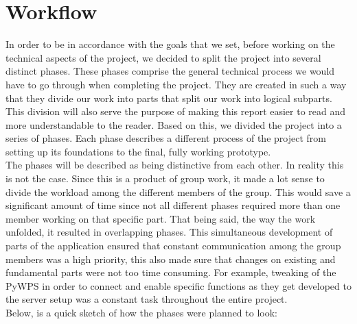 \section{Workflow}
In order to be in accordance with the goals that we set, before working on the technical aspects of the project, we decided to split the project into several distinct phases. These phases comprise the general technical process we would have to go through when completing the project. They are created in such a way that they divide our work into parts that split our work into logical subparts. This division will also serve the purpose of making this report easier to read and more understandable to the reader.   
Based on this, we divided the project into a series of phases. Each phase describes a different process of the project from setting up its foundations to the final, fully working prototype. \\
The phases will be described as being distinctive from each other. In reality this is not the case. Since this is a product of group work, it made a lot sense to divide the workload among the different members of the group. This would save a significant amount of time since not all different phases required more than one member working on that specific part. That being said, the way the work unfolded, it resulted in overlapping phases. This simultaneous development of parts of the application ensured that constant communication among the group members was a high priority, this also made sure that changes on existing and fundamental parts were not too time consuming. For example, tweaking of the PyWPS  in order to connect and enable specific functions as they get developed to the server setup was a constant task throughout the entire project.\\

Below, is a quick sketch of how the phases were planned to look:

